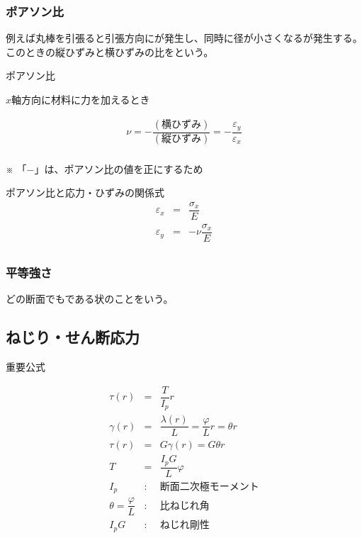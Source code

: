 \documentclass[a4paper]{jsarticle}
\begin{document}
\subsubsection{ポアソン比}
例えば丸棒を引張ると引張方向にが発生し、同時に径が小さくなるが発生する。\\
このときの縦ひずみと横ひずみの比をという。
\begin{itembox}[l]{ポアソン比}
    \begin{center}
        $x$軸方向に材料に力を加えるとき
    \end{center}
    \begin{eqnarray*}
        \nu=-\dfrac{\left(横ひずみ\right)}{\left(縦ひずみ\right)}=-\dfrac{\varepsilon_y}{\varepsilon_x}\\
    \end{eqnarray*}
    \begin{center}
        ※ 「$-$」は、ポアソン比の値を正にするため
    \end{center}
\end{itembox}
\begin{itembox}[l]{ポアソン比と応力・ひずみの関係式}
    \begin{eqnarray*}
        \varepsilon_x&=&\dfrac{\sigma_x}{E}\\
        \varepsilon_y&=&-\nu\dfrac{\sigma_x}{E}\\
    \end{eqnarray*}
\end{itembox}
\subsubsection{平等強さ}
どの断面でもである状のことをいう。
\subsection{ねじり・せん断応力}
\begin{itembox}[l]{重要公式}
    \begin{center}
        \begin{eqnarray*}
            \tau\left(r\right)&=&\dfrac{T}{I_p} r\\
            \gamma\left(r\right)&=&\dfrac{\lambda\left(r\right)}{L}=\dfrac{\varphi}{L}r=\theta r\\
            \tau\left(r\right)&=&G\gamma\left(r\right)=G\theta r\\
            T&=&\dfrac{I_pG}{L}\varphi\\
            I_p&:&断面二次極モーメント\\
            \theta=\dfrac{\varphi}{L}&:&比ねじれ角\\
            I_pG&:&ねじれ剛性\\
        \end{eqnarray*}
    \end{center}
\end{itembox}
\end{document}
